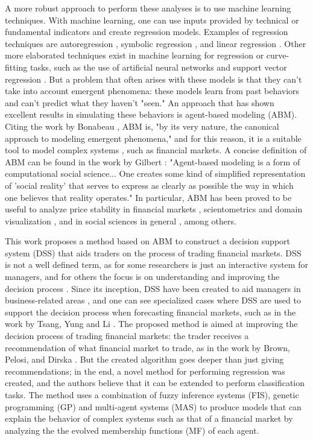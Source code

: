 \documentclass[12pt,journal,compsoc]{IEEEtran}
\begin{document}
A more robust approach to perform these analyses is to use machine learning techniques. With machine learning, one can use inputs provided by technical or fundamental indicators and create regression models. Examples of regression techniques are autoregression \cite{burg1968new}, symbolic regression \cite{billard2002symbolic}, and linear regression \cite{kutner2004applied}. Other more elaborated techniques exist in machine learning for regression or curve-fitting tasks, such as the use of artificial neural networks \cite{melin2007hybrid} and support vector regression \cite{basak2007support}. But a problem that often arises with these models is that they can't take into account emergent phenomena: these models learn from past behaviors and can't predict what they haven't "seen." An approach that has shown excellent results in simulating these behaviors is agent-based modeling (ABM). Citing the work by Bonabeau \cite{bonabeau2002agent}, ABM is, "by its very nature, the canonical approach to modeling emergent phenomena," and for this reason, it is a suitable tool to model complex systems \cite{jennings2001agent}, such as financial markets. A concise definition of ABM can be found in the work by Gilbert \cite{gilbert2008agent}: "Agent-based modeling is a form of computational social science... One creates some kind of simplified representation of 'social reality' that serves to express as clearly as possible the way in which one believes that reality operates." In particular, ABM has been proved to be useful to analyze price stability in financial markets \cite{Pellizzari2007}, scientometrics and domain visualization \cite{Niazi2011}, and in social sciences in general \cite{gilbert2008agent}, among others.

This work proposes a method based on ABM to construct a decision support system (DSS) that aids traders on the process of trading financial markets. DSS is not a well defined term, as for some researchers is just an interactive system for managers, and for others the focus is on understanding and improving the decision process \cite{keen1980decision}. Since its inception, DSS have been created to aid managers in business-related areas \cite{Sprague1980} \cite{little1979decision}, and one can see specialized cases where DSS are used to support the decision process when forecasting financial markets, such as in the work by Tsang, Yung and Li \cite{Tsang2004}. The proposed method is aimed at improving the decision process of trading financial markets: the trader receives a recommendation of what financial market to trade, as in the work by Brown, Pelosi, and Dirska \cite{brown2013dynamic}. But the created algorithm goes deeper than just giving recommendations; in the end, a novel method for performing regression was created, and the authors believe that it can be extended to perform classification tasks. The method uses a combination of fuzzy inference systems (FIS), genetic programming (GP) \cite{poli2008field} \cite{Koza1992} and multi-agent systems (MAS) \cite{Shoham2009} to produce models that can explain the behavior of complex systems such as that of a financial market by analyzing the the evolved membership functions (MF) of each agent.
\end{document}
